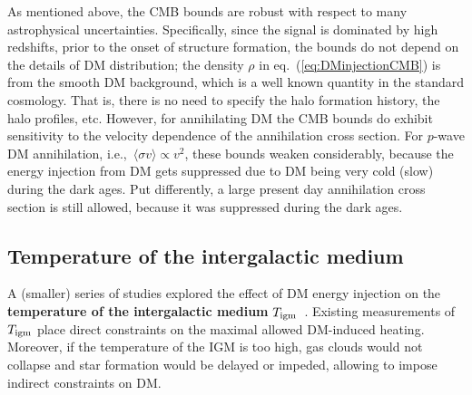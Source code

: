As mentioned above, the CMB bounds are robust with respect to many astrophysical uncertainties. Specifically, since the signal is dominated by high redshifts, 
prior to the onset of structure formation, the bounds do not depend on the details of DM distribution; the density $\rho$ in eq.~(\ref{eq:DMinjectionCMB}) is from the
smooth DM background, which is a well known quantity in the standard cosmology. That is, there is no need to specify the halo formation history, the halo profiles, etc.
However, for annihilating DM the CMB bounds do exhibit sensitivity to the velocity dependence of the annihilation cross section. 
For $p$-wave  DM annihilation, i.e.,~$\langle \sigma v \rangle \propto v^2$, these bounds weaken considerably, because the energy injection from DM gets suppressed due to DM being very cold (slow) during the dark ages. Put differently,  a large present day annihilation cross section is still allowed, because it was suppressed during the dark ages. 


\subsection{Temperature of the intergalactic medium}
\label{sec:boundsTigm}

A (smaller) series of studies explored the effect of DM energy injection on the {\bf temperature of the intergalactic medium} $T_{\rm igm}$~\cite{TIGMbounds}. 
Existing measurements of $T_{\rm igm}$ place direct constraints on the maximal allowed DM-induced heating. Moreover, if the temperature of the IGM is too high, gas clouds would not collapse and star formation would be delayed or impeded, allowing to impose indirect constraints on DM. 




